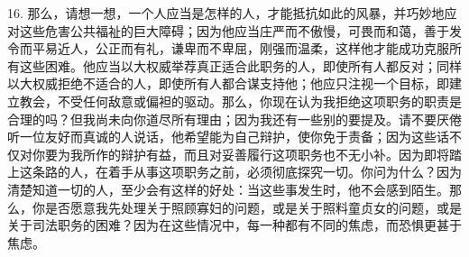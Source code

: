 16. 那么，请想一想，一个人应当是怎样的人，才能抵抗如此的风暴，并巧妙地应对这些危害公共福祉的巨大障碍；因为他应当庄严而不傲慢，可畏而和蔼，善于发令而平易近人，公正而有礼，谦卑而不卑屈，刚强而温柔，这样他才能成功克服所有这些困难。他应当以大权威举荐真正适合此职务的人，即使所有人都反对；同样以大权威拒绝不适合的人，即使所有人都合谋支持他；他应只注视一个目标，即建立教会，不受任何敌意或偏袒的驱动。那么，你现在认为我拒绝这项职务的职责是合理的吗？但我尚未向你道尽所有理由；因为我还有一些别的要提及。请不要厌倦听一位友好而真诚的人说话，他希望能为自己辩护，使你免于责备；因为这些话不仅对你要为我所作的辩护有益，而且对妥善履行这项职务也不无小补。因为即将踏上这条路的人，在着手从事这项职务之前，必须彻底探究一切。你问为什么？因为清楚知道一切的人，至少会有这样的好处：当这些事发生时，他不会感到陌生。那么，你是否愿意我先处理关于照顾寡妇的问题，或是关于照料童贞女的问题，或是关于司法职务的困难？因为在这些情况中，每一种都有不同的焦虑，而恐惧更甚于焦虑。\par

